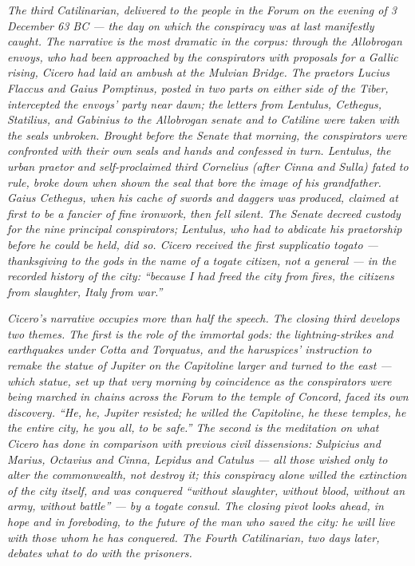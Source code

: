 
\textit{The third Catilinarian, delivered to the people in
the Forum on the evening of 3 December 63 BC --- the day on
which the conspiracy was at last manifestly caught. The
narrative is the most dramatic in the corpus: through the
Allobrogan envoys, who had been approached by the
conspirators with proposals for a Gallic rising, Cicero had
laid an ambush at the Mulvian Bridge. The praetors Lucius
Flaccus and Gaius Pomptinus, posted in two parts on either
side of the Tiber, intercepted the envoys' party near dawn;
the letters from Lentulus, Cethegus, Statilius, and Gabinius
to the Allobrogan senate and to Catiline were taken with the
seals unbroken. Brought before the Senate that morning, the
conspirators were confronted with their own seals and hands
and confessed in turn. Lentulus, the urban praetor and
self-proclaimed third Cornelius (after Cinna and Sulla)
fated to rule, broke down when shown the seal that bore the
image of his grandfather. Gaius Cethegus, when his cache of
swords and daggers was produced, claimed at first to be a
fancier of fine ironwork, then fell silent. The Senate
decreed custody for the nine principal conspirators;
Lentulus, who had to abdicate his praetorship before he could
be held, did so. Cicero received the first \textit{supplicatio
togato} --- thanksgiving to the gods in the name of a togate
citizen, not a general --- in the recorded history of the
city: ``because I had freed the city from fires, the citizens
from slaughter, Italy from war.''}

\textit{Cicero's narrative occupies more than half the speech.
The closing third develops two themes. The first is the role
of the immortal gods: the lightning-strikes and earthquakes
under Cotta and Torquatus, and the haruspices' instruction to
remake the statue of Jupiter on the Capitoline larger and
turned to the east --- which statue, set up that very morning
by coincidence as the conspirators were being marched in
chains across the Forum to the temple of Concord, faced its
own discovery. ``He, he, Jupiter resisted; he willed the
Capitoline, he these temples, he the entire city, he you
all, to be safe.'' The second is the meditation on what
Cicero has done in comparison with previous civil
dissensions: Sulpicius and Marius, Octavius and Cinna, Lepidus
and Catulus --- all those wished only to alter the
commonwealth, not destroy it; this conspiracy alone willed the
extinction of the city itself, and was conquered ``without
slaughter, without blood, without an army, without battle''
--- by a togate consul. The closing pivot looks ahead, in
hope and in foreboding, to the future of the man who saved
the city: he will live with those whom he has conquered.
The Fourth Catilinarian, two days later, debates what to do
with the prisoners.}

